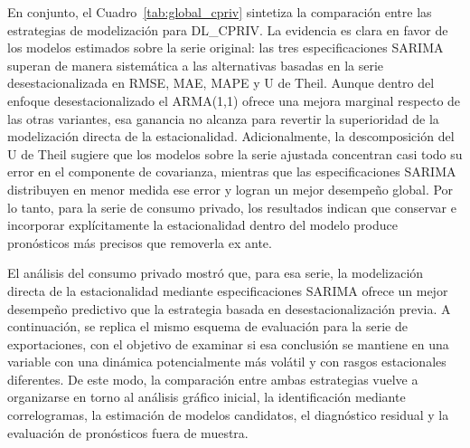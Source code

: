 \documentclass[11pt]{article}
\begin{document}
En conjunto, el Cuadro~\ref{tab:global_cpriv} sintetiza la comparación entre las estrategias de modelización para DL\_CPRIV. La evidencia es clara en favor de los modelos estimados sobre la serie original: las tres especificaciones SARIMA superan de manera sistemática a las alternativas basadas en la serie desestacionalizada en RMSE, MAE, MAPE y U de Theil. Aunque dentro del enfoque desestacionalizado el ARMA(1,1) ofrece una mejora marginal respecto de las otras variantes, esa ganancia no alcanza para revertir la superioridad de la modelización directa de la estacionalidad. Adicionalmente, la descomposición del U de Theil sugiere que los modelos sobre la serie ajustada concentran casi todo su error en el componente de covarianza, mientras que las especificaciones SARIMA distribuyen en menor medida ese error y logran un mejor desempeño global. Por lo tanto, para la serie de consumo privado, los resultados indican que conservar e incorporar explícitamente la estacionalidad dentro del modelo produce pronósticos más precisos que removerla ex ante.

\begin{table}[H]
\centering
\caption{Comparación global de métodos de pronóstico – DL\_CPRIV}
\label{tab:global_cpriv}
\end{table}

El análisis del consumo privado mostró que, para esa serie, la modelización directa de la estacionalidad mediante especificaciones SARIMA ofrece un mejor desempeño predictivo que la estrategia basada en desestacionalización previa. A continuación, se replica el mismo esquema de evaluación para la serie de exportaciones, con el objetivo de examinar si esa conclusión se mantiene en una variable con una dinámica potencialmente más volátil y con rasgos estacionales diferentes. De este modo, la comparación entre ambas estrategias vuelve a organizarse en torno al análisis gráfico inicial, la identificación mediante correlogramas, la estimación de modelos candidatos, el diagnóstico residual y la evaluación de pronósticos fuera de muestra.
\end{document}
